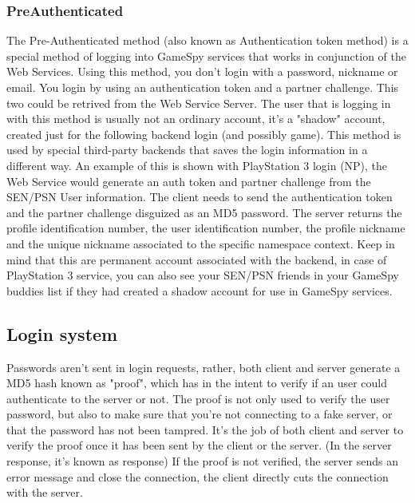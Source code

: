 \documentclass[oneside,titlepage,a4paper]{Definition/retrospy} %
\begin{document}
		\subsubsection{PreAuthenticated}
			The Pre-Authenticated method (also known as Authentication token method) is a special method of logging into GameSpy services that works in conjunction of the Web Services.
			Using this method, you don't login with a password, nickname or email. You login by using an authentication token and a partner challenge.
			This two could be retrived from the Web Service Server.
			The user that is logging in with this method is usually not an ordinary account, it's a "shadow" account, created just for the following backend login (and possibly game).
			This method is used by special third-party backends that saves the login information in a different way.
			An example of this is shown with PlayStation 3 login (NP), the Web Service would generate an auth token and partner challenge from the SEN/PSN User information.
			The client needs to send the authentication token and the partner challenge disguized as an MD5 password.
			The server returns the profile identification number, the user identification number, the profile nickname and the unique nickname associated to the specific namespace context.
			Keep in mind that this are permanent account associated with the backend, in case of PlayStation 3 service, you can also see your SEN/PSN friends in your GameSpy buddies list if they had created a shadow account for use in GameSpy services.


		\subsection{Login system}
			Passwords aren't sent in login requests, rather, both client and server generate a MD5 hash known as "proof", which has in the intent to verify if an user could authenticate to the server or not.
			The proof is not only used to verify the user password, but also to make sure that you're not connecting to a fake server, or that the password has not been tampred.
			It's the job of both client and server to verify the proof once it has been sent by the client or the server. (In the server response, it's known as response)
			If the proof is not verified, the server sends an error message and close the connection, the client directly cuts the connection with the server.
\end{document}
